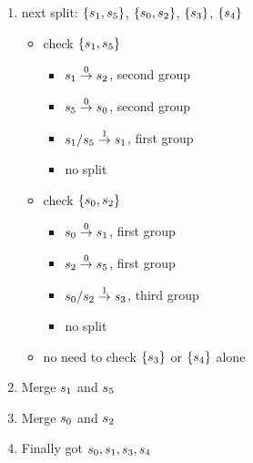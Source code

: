 \begin{enumerate}
\item next split: \(\{s_{1},s_{5}\}\), \(\{s_{0}, s_{2}\}\), \(\{s_{3}\}\), \(\{s_{4}\}\)
  \begin{itemize}
  \item check \(\{s_{1},s_{5}\}\)
    \begin{itemize}
      \item \(s_{1} \overset{0}{\rightarrow} s_{2}\), second group
      \item \(s_{5} \overset{0}{\rightarrow} s_{0}\), second group
      \item \(s_{1}/s_{5} \overset{1}{\rightarrow} s_{1}\), first group
      \item [] no split
    \end{itemize}
  \item check \(\{s_{0}, s_{2}\}\)
    \begin{itemize}
      \item \(s_{0} \overset{0}{\rightarrow} s_{1}\), first group
      \item \(s_{2} \overset{0}{\rightarrow} s_{5}\), first group
      \item \(s_{0}/s_{2} \overset{1}{\rightarrow} s_{3}\), third group
      \item[] no split
    \end{itemize}
  \item no need to check \(\{s_{3}\}\) or \(\{s_{4}\}\) alone
  \end{itemize}
\item Merge \(s_{1}\) and \(s_{5}\)
\item Merge \(s_{0}\) and \(s_{2}\)
\item Finally got \(s_{0}, s_{1}, s_{3}, s_{4}\)
\end{enumerate}
